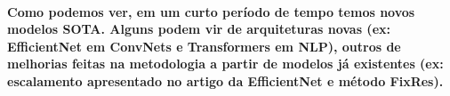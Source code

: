 \documentclass[a4paper]{article}    %
\begin{document}
\paragraph{Como podemos ver, em um curto período de tempo temos novos modelos SOTA. Alguns podem vir de arquiteturas novas (ex: EfficientNet em ConvNets e Transformers em NLP), outros de melhorias feitas na metodologia a partir de modelos já existentes (ex: escalamento apresentado no artigo da EfficientNet e método FixRes).}

\end{document}
